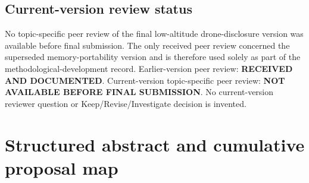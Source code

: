 \subsection{Current-version review status}
No topic-specific peer review of the final low-altitude drone-disclosure version was available before final submission. The only received peer review concerned the superseded memory-portability version and is therefore used solely as part of the methodological-development record. Earlier-version peer review: \textbf{RECEIVED AND DOCUMENTED}. Current-version topic-specific peer review: \textbf{NOT AVAILABLE BEFORE FINAL SUBMISSION}. No current-version reviewer question or Keep/Revise/Investigate decision is invented.
\endgroup

\clearpage\onecolumn
\section{Structured abstract and cumulative proposal map}
\label{app:abstract}
